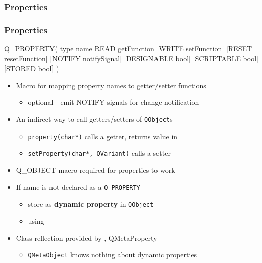\subsubsection{Properties}
\begin{frame}[fragile]
\frametitle{Properties}
\begin{cpp}
    Q_PROPERTY( type name READ getFunction [WRITE setFunction]
    [RESET resetFunction] [NOTIFY notifySignal] [DESIGNABLE bool]
    [SCRIPTABLE bool] [STORED bool] )
\end{cpp}
\begin{itemize}
\item Macro for mapping property names to getter/setter functions
    \begin{itemize}
    \item optional - emit NOTIFY signals for change notification 
    \end{itemize}
\item An indirect way to call getters/setters of \texttt{QObject}s
    \begin{itemize}
    \item \texttt{property(char*)} calls a getter, returns value in 
    \item \texttt{setProperty(char*, QVariant)} calls a setter
    \end{itemize}
\item Q\_OBJECT macro required for properties to work

\item If name is not declared as a \texttt{Q\_PROPERTY}
    \begin{itemize}
    \item store as \textbf{dynamic property} in \texttt{QObject}
    \item using   
    \end{itemize}
\item Class-reflection provided by , \iCls
{QMetaProperty}
    \begin{itemize}
    \item \texttt{QMetaObject} knows nothing about dynamic properties
    \end{itemize}
\end{itemize}
\end{frame}

